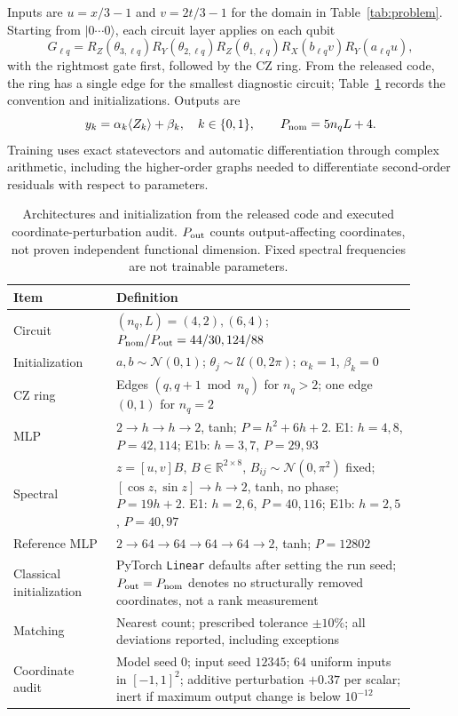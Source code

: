 \documentclass[11pt]{article}
\begin{document}
Inputs are $u=x/3-1$ and $v=2t/3-1$ for the domain in
Table~\ref{tab:problem}. Starting from $|0\cdots0\rangle$, each circuit
layer applies on each qubit
\begin{equation}
 G_{\ell q}=R_Z(\theta_{3,\ell q})R_Y(\theta_{2,\ell q})
 R_Z(\theta_{1,\ell q})R_X(b_{\ell q}v)R_Y(a_{\ell q}u),
 \label{eq:gate}
\end{equation}
with the rightmost gate first, followed by the CZ ring. From the released
code, the ring has a single edge for the smallest diagnostic circuit;
Table~\ref{tab:models} records the convention and initializations. Outputs are
\begin{equation}
 y_k=\alpha_k\langle Z_k\rangle+\beta_k,\quad k\in\{0,1\},\qquad
 P_{\rm nom}=5n_qL+4.
 \label{eq:readout}
\end{equation}
Training uses exact statevectors and automatic differentiation through
complex arithmetic, including the higher-order graphs needed to
differentiate second-order residuals with respect to parameters.

\begin{table}[htbp]
\centering\small
\caption{Architectures and initialization from the released code and
executed coordinate-perturbation audit. $P_{\rm out}$ counts
output-affecting coordinates, not proven independent functional dimension.
Fixed spectral frequencies are not trainable parameters.}
\label{tab:models}
\begin{tabular}{p{0.23\linewidth}p{0.67\linewidth}}
\toprule
Item & Definition \\
\midrule
Circuit & $(n_q,L)=(4,2),(6,4)$;
$P_{\rm nom}/P_{\rm out}=44/30,124/88$ \\
Initialization & $a,b\sim\mathcal N(0,1)$;
$\theta_j\sim\mathcal U(0,2\pi)$; $\alpha_k=1$, $\beta_k=0$ \\
CZ ring & Edges $(q,q+1\bmod n_q)$ for $n_q>2$;
one edge $(0,1)$ for $n_q=2$ \\
MLP & $2\to h\to h\to2$, tanh;
$P=h^2+6h+2$. E1: $h=4,8$, $P=42,114$;
E1b: $h=3,7$, $P=29,93$ \\
Spectral & $z=[u,v]B$, $B\in\mathbb R^{2\times8}$,
$B_{ij}\sim\mathcal N(0,\pi^2)$ fixed;
$[\cos z,\sin z]\to h\to2$, tanh, no phase;
$P=19h+2$. E1: $h=2,6$, $P=40,116$;
E1b: $h=2,5$, $P=40,97$ \\
Reference MLP & $2\to64\to64\to64\to64\to2$, tanh;
$P=12802$ \\
Classical initialization & PyTorch \texttt{Linear} defaults after setting
the run seed; $P_{\rm out}=P_{\rm nom}$ denotes no structurally removed
coordinates, not a rank measurement \\
Matching & Nearest count; prescribed tolerance $\pm10\%$;
all deviations reported, including exceptions \\
Coordinate audit & Model seed $0$; input seed $12345$;
$64$ uniform inputs in $[-1,1]^2$; additive perturbation $+0.37$
per scalar; inert if maximum output change is below $10^{-12}$ \\
\bottomrule
\end{tabular}
\end{table}
\end{document}
